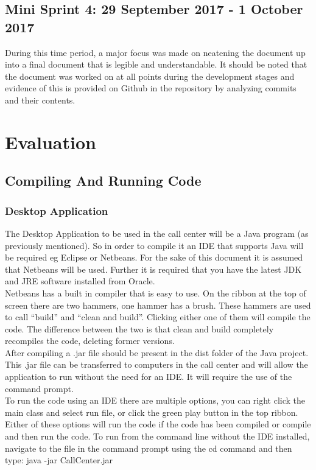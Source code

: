 \documentclass[a4paper,12pt]{article}
\begin{document}
\subsection{Mini Sprint 4: 29 September 2017 - 1 October 2017}
During this time period, a major focus was made on neatening the document up into a final document that is legible and understandable. It should be noted that the document was worked on at all points during the development stages and evidence of this is provided on Github in the repository by analyzing commits and their contents.

\newpage
\section{Evaluation}
\subsection{Compiling And Running Code}
\subsubsection{Desktop Application}
The Desktop Application to be used in the call center will be a Java program (as previously mentioned). So in order to compile it an IDE that supports Java will be required eg Eclipse or Netbeans. For the sake of this document it is assumed that Netbeans will be used. Further it is required that you have the latest JDK and JRE software installed from Oracle.\\
Netbeans has a built in compiler that is easy to use. On the ribbon at the top of screen there are two hammers, one hammer has a brush. These hammers are used to call ``build'' and ``clean and build''. Clicking either one of them will compile the code. The difference between the two is that clean and build completely recompiles the code, deleting former versions.\\
After compiling a .jar file should be present in the dist folder of the Java project. This .jar  file can be transferred to computers in the call center and will allow the application to run without the need for an IDE. It will require the use of the command prompt.\\To run the code using an IDE there are multiple options, you can right click the main class and select run file, or click the green play button in the top ribbon. Either of these options will run the code if the code has been compiled or compile and then run the code. To run from the command line without the IDE installed, navigate to the file in the command prompt using the cd command and then type: java -jar CallCenter.jar
\newpage
\end{document}
